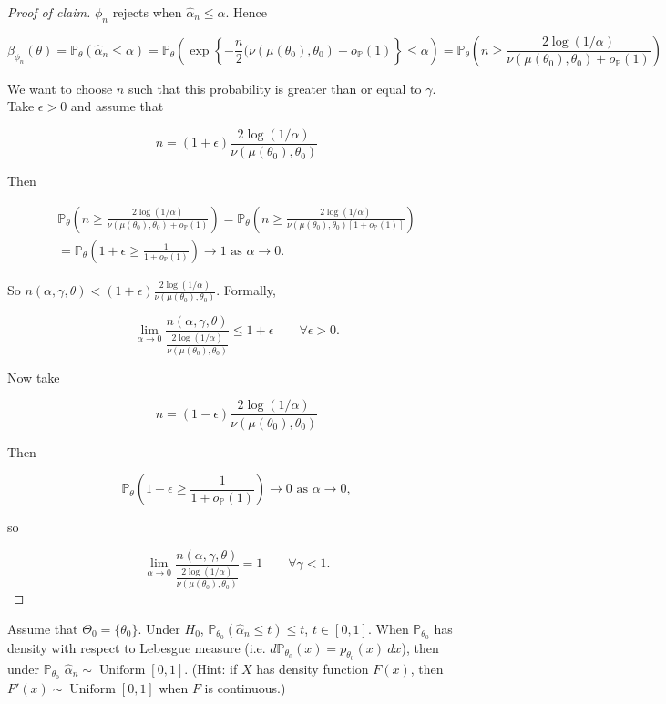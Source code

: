 \begin{proof}[Proof of claim]

\(\phi_n\) rejects when \(\hat{\alpha}_n \leq \alpha\). Hence 

\[
\beta_{\phi_n}(\theta) = \mathbb{P}_\theta(\hat{\alpha}_n \leq \alpha) = \mathbb{P}_\theta \left(  \exp \left\{- \frac{n}{2}( \nu(\mu(\theta_0), \theta_0) + o_{\mathbb{P}}(1) \right\} \leq \alpha \right) 
= \mathbb{P}_\theta \left( n \geq \frac{2 \log(1/\alpha)}{\nu(\mu(\theta_0),\theta_0) + o_{\mathbb{P}}(1)}\right)
\]

We want to choose \(n\) such that this probability is greater than or equal to \(\gamma\). Take \(\epsilon >0\) and assume that 

\[
n = (1 + \epsilon) \frac{2 \log(1/\alpha)}{\nu(\mu(\theta_0),\theta_0) }
\]

Then

\begin{multline*}
\mathbb{P}_\theta \left( n \geq \frac{2 \log(1/\alpha)}{\nu(\mu(\theta_0),\theta_0) + o_{\mathbb{P}}(1)}\right) = \mathbb{P}_\theta \left( n \geq \frac{2 \log(1/\alpha)}{\nu(\mu(\theta_0),\theta_0) [1 + o_{\mathbb{P}}(1)]}\right) 
\\ = \mathbb{P}_\theta \left( 1 + \epsilon \geq \frac{1}{1 + o_{\mathbb{P}}(1)}\right) \to 1 \text{ as } \alpha \to 0.
\end{multline*}

So \(n(\alpha, \gamma, \theta) < (1 + \epsilon) \frac{2 \log(1/\alpha)}{\nu(\mu(\theta_0),\theta_0) }\). Formally,

\[
\lim_{\alpha \to 0} \frac{n (\alpha, \gamma, \theta)}{ \frac{2 \log(1/\alpha)}{\nu(\mu(\theta_0),\theta_0) }} \leq 1 + \epsilon \qquad \forall \epsilon > 0.
\]

Now take

\[
n = (1 - \epsilon) \frac{2 \log(1/\alpha)}{\nu(\mu(\theta_0),\theta_0) }
\]

Then 

\[
\mathbb{P}_\theta \left(1 - \epsilon \geq \frac{1}{1 + o_{\mathbb{P}}(1)} \right) \to 0 \text{ as } \alpha \to 0,
\]

so

\[
\lim_{\alpha \to 0} \frac{n(\alpha, \gamma, \theta)}{\frac{2 \log(1/\alpha)}{\nu(\mu(\theta_0),\theta_0) }} =1 \qquad \forall \gamma < 1.
\]

\end{proof}

\begin{exercise}

Assume that \(\Theta_0 = \{\theta_0\}\). Under \(H_0\), \(\mathbb{P}_{\theta_0}(\hat{\alpha}_n \leq t) \leq t\), \(t \in [0,1]\). When \(\mathbb{P}_{\theta_0}\) has density with respect to Lebesgue measure (i.e. \(d \mathbb{P}_{\theta_0}(x) = p_{\theta_0}(x) \ dx\)), then under \(\mathbb{P}_{\theta_0}\) \(\hat{\alpha}_n \sim \operatorname{Uniform}[0,1]\). (Hint: if \(X\) has density function \(F(x)\), then \(F'(x) \sim \operatorname{Uniform}[0,1]\) when \(F\) is continuous.)

\end{exercise}

